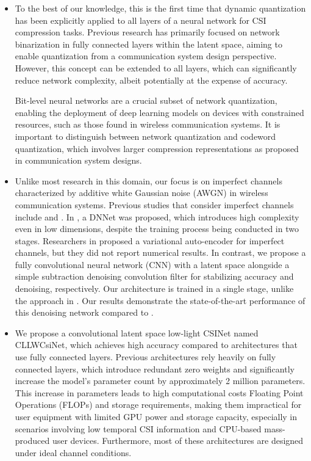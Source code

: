\documentclass[lettersize,journal]{IEEEtran}
\begin{document}
\begin{itemize}
	\item To the best of our knowledge, this is the first time that dynamic quantization has been explicitly applied to all layers of a neural network for CSI compression tasks. Previous research has primarily focused on network binarization in fully connected layers within the latent space, aiming to enable quantization from a communication system design perspective. However, this concept can be extended to all layers, which can significantly reduce network complexity, albeit potentially at the expense of accuracy.
	
	Bit-level neural networks are a crucial subset of network quantization, enabling the deployment of deep learning models on devices with constrained resources, such as those found in wireless communication systems. It is important to distinguish between network quantization and codeword quantization, which involves larger compression representations as proposed in communication system designs.
	
	
	\item Unlike most research in this domain, our focus is on imperfect channels characterized by additive white Gaussian noise (AWGN) in wireless communication systems. Previous studies that consider imperfect channels include \cite{abw} and \cite{abs}. In \cite{abw}, a DNNet was proposed, which introduces high complexity even in low dimensions, despite the training process being conducted in two stages. Researchers in \cite{abs} proposed a variational auto-encoder for imperfect channels, but they did not report numerical results. In contrast, we propose a fully convolutional neural network (CNN) with a latent space alongside a simple subtraction denoising convolution filter for stabilizing accuracy and denoising, respectively. Our architecture is trained in a single stage, unlike the approach in \cite{abw}. Our results demonstrate the state-of-the-art performance of this denoising network compared to \cite{abw}.
	
	\item We propose a convolutional latent space low-light CSINet named CLLWCsiNet, which achieves high accuracy compared to architectures that use fully connected layers. Previous architectures rely heavily on fully connected layers, which introduce redundant zero weights and significantly increase the model's parameter count by approximately 2 million parameters. This increase in parameters leads to high computational costs Floating Point Operations (FLOPs) and storage requirements, making them impractical for user equipment with limited GPU power and storage capacity, especially in scenarios involving low temporal CSI information and CPU-based mass-produced user devices. Furthermore, most of these architectures are designed under ideal channel conditions.

	
	
	
\end{itemize}
\end{document}
